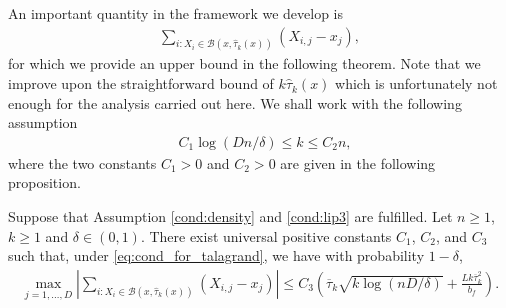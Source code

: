 An important quantity in the framework we develop is 
\begin{align*}
    \sum_{i : X_i \in \mathcal B (x,  \hat \tau_k (x)) } (X_{i,j}-x_j)   ,
\end{align*}
for which we provide an upper bound in the following theorem. Note that we improve upon the straightforward bound of $ k \hat \tau_k (x)$ which is unfortunately not enough for the analysis carried out here.
We shall work with the following assumption 
\begin{align}\label{eq:cond_for_talagrand}
& C_1    \log( D n / \delta)  \leq k  \leq  C_2  n ,
\end{align}
where the two constants $C_1>0$ and $C_2>0$ are given in the following proposition.

\begin{proposition}\label{prop:key_lemma}
 Suppose that Assumption \ref{cond:density} and \ref{cond:lip3} are fulfilled. Let $n\geq 1$, $k\geq 1$ and $\delta\in (0,1)$. There exist universal positive constants $C_1$, $C_2$, and $C_3$ such that, under \eqref{eq:cond_for_talagrand}, we have with probability $1-\delta$,
\begin{align*}
\max_{j=1,\ldots, D}  \left|   \sum_{i : X_i \in \mathcal B (x,  \hat \tau_k(x) ) } (X_{i,j}-x_j)   \right|\leq     C_3    \left( \overline \tau_k     \sqrt {   k  \log(  n D  /  \delta )  }  +  \frac { L k\overline\tau_k   ^{2}}{ b_f  }   \right).
\end{align*}
\end{proposition}

